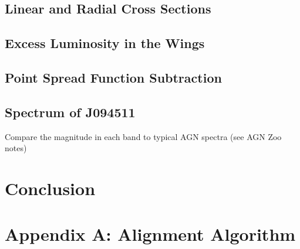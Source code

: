 \documentclass[a4paper,11pt]{article}
\begin{document}
\subsection{Linear and Radial Cross Sections}
\subsection{Excess Luminosity in the Wings}
\subsection{Point Spread Function Subtraction}
\subsection{Spectrum of J094511}
Compare the magnitude in each band to typical AGN spectra (see AGN Zoo notes)
\section{Conclusion}

\printbibliography

\section*{Appendix A: Alignment Algorithm}
\end{document}
